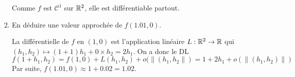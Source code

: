 \documentclass{tp_um}
\begin{document}
\begin{enumerate}
\bigskip
Comme $f$ est $\mathcal C^1$ sur $\mathbb{R}^2$, elle est différentiable partout.
\bigskip

	\item %
		En déduire une valeur approchée de $f(1.01,0)$. %

		\bigskip

		La différentielle de $f$ en $(1,0)$ est l'application linéaire $L:\mathbb{R}^2 \to \mathbb{R}$ qui $(h_1,h_2) \mapsto (1 + 1) h_1 + 0\times h_2 =2 h_1$. On a donc le DL
	\[
	f(1+h_1,h_2) = f(1,0) + L(h_1,h_2) + o(\|(h_1,h_2\|) = 1 + 2h_1 + o(\|(h_1,h_2)\|)
\]
Par suite,   $f(1.01,0) \approx 1+0.02 = 1.02$.
		\bigskip
\end{enumerate}
\end{document}
